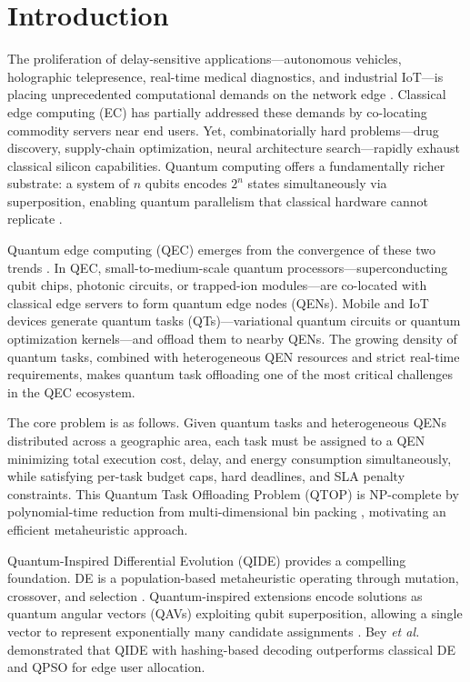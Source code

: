 \documentclass[10pt,twocolumn]{article}
\begin{document}
\section{Introduction}

The proliferation of delay-sensitive applications---autonomous vehicles, holographic telepresence, real-time medical diagnostics, and industrial IoT---is placing unprecedented computational demands on the network edge \cite{ref1,ref2}. Classical edge computing (EC) has partially addressed these demands by co-locating commodity servers near end users. Yet, combinatorially hard problems---drug discovery, supply-chain optimization, neural architecture search---rapidly exhaust classical silicon capabilities. Quantum computing offers a fundamentally richer substrate: a system of $n$ qubits encodes $2^n$ states simultaneously via superposition, enabling quantum parallelism that classical hardware cannot replicate \cite{ref4}.

Quantum edge computing (QEC) emerges from the convergence of these two trends \cite{ref5}. In QEC, small-to-medium-scale quantum processors---superconducting qubit chips, photonic circuits, or trapped-ion modules---are co-located with classical edge servers to form quantum edge nodes (QENs). Mobile and IoT devices generate quantum tasks (QTs)---variational quantum circuits or quantum optimization kernels---and offload them to nearby QENs. The growing density of quantum tasks, combined with heterogeneous QEN resources and strict real-time requirements, makes quantum task offloading one of the most critical challenges in the QEC ecosystem.

The core problem is as follows. Given quantum tasks and heterogeneous QENs distributed across a geographic area, each task must be assigned to a QEN minimizing total execution cost, delay, and energy consumption simultaneously, while satisfying per-task budget caps, hard deadlines, and SLA penalty constraints. This Quantum Task Offloading Problem (QTOP) is NP-complete by polynomial-time reduction from multi-dimensional bin packing \cite{ref6}, motivating an efficient metaheuristic approach.

Quantum-Inspired Differential Evolution (QIDE) provides a compelling foundation. DE is a population-based metaheuristic operating through mutation, crossover, and selection \cite{ref7}. Quantum-inspired extensions encode solutions as quantum angular vectors (QAVs) exploiting qubit superposition, allowing a single vector to represent exponentially many candidate assignments \cite{ref8}. Bey \textit{et al.} \cite{ref14} demonstrated that QIDE with hashing-based decoding outperforms classical DE and QPSO for edge user allocation.
\end{document}
